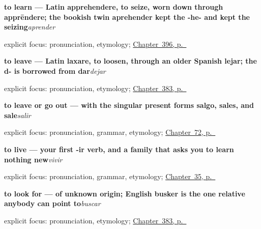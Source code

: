 \noindent\begin{minipage}[t]{\linewidth}
\raggedright
\textbf{to learn — Latin apprehendere, to seize, worn down through apprēndere; the bookish twin aprehender kept the -he- and kept the seizing}\enspace\emph{aprender}\par
\footnotesize explicit focus: pronunciation, etymology; \hyperref[ch:aprender-y-cocinar]{Chapter~396, p.~\pageref*{ch:aprender-y-cocinar}}
\end{minipage}\par\smallskip

\noindent\begin{minipage}[t]{\linewidth}
\raggedright
\textbf{to leave — Latin laxare, to loosen, through an older Spanish lejar; the d- is borrowed from dar}\enspace\emph{dejar}\par
\footnotesize explicit focus: pronunciation, etymology; \hyperref[ch:guardar-y-dejar]{Chapter~383, p.~\pageref*{ch:guardar-y-dejar}}
\end{minipage}\par\smallskip

\noindent\begin{minipage}[t]{\linewidth}
\raggedright
\textbf{to leave or go out — with the singular present forms salgo, sales, and sale}\enspace\emph{salir}\par
\footnotesize explicit focus: pronunciation, grammar, etymology; \hyperref[ch:spanish-salir]{Chapter~72, p.~\pageref*{ch:spanish-salir}}
\end{minipage}\par\smallskip

\noindent\begin{minipage}[t]{\linewidth}
\raggedright
\textbf{to live — your first -ir verb, and a family that asks you to learn nothing new}\enspace\emph{vivir}\par
\footnotesize explicit focus: pronunciation, grammar, etymology; \hyperref[ch:spanish-vivir]{Chapter~35, p.~\pageref*{ch:spanish-vivir}}
\end{minipage}\par\smallskip

\noindent\begin{minipage}[t]{\linewidth}
\raggedright
\textbf{to look for — of unknown origin; English busker is the one relative anybody can point to}\enspace\emph{buscar}\par
\footnotesize explicit focus: pronunciation, etymology; \hyperref[ch:guardar-y-dejar]{Chapter~383, p.~\pageref*{ch:guardar-y-dejar}}
\end{minipage}\par\smallskip

